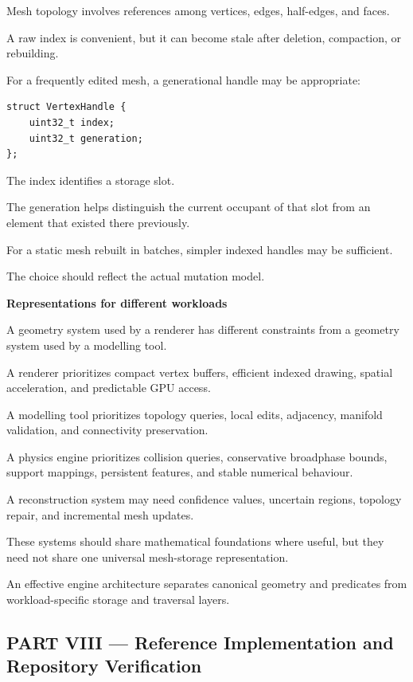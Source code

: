 Mesh topology involves references among vertices, edges, half-edges, and faces.

A raw index is convenient, but it can become stale after deletion, compaction, or rebuilding.

For a frequently edited mesh, a generational handle may be appropriate:

\begin{verbatim}
struct VertexHandle {
    uint32_t index;
    uint32_t generation;
};
\end{verbatim}

The index identifies a storage slot.

The generation helps distinguish the current occupant of that slot from an element that existed there previously.

For a static mesh rebuilt in batches, simpler indexed handles may be sufficient.

The choice should reflect the actual mutation model.

\textbf{Representations for different workloads}

A geometry system used by a renderer has different constraints from a geometry system used by a modelling tool.

A renderer prioritizes compact vertex buffers, efficient indexed drawing, spatial acceleration, and predictable GPU access.

A modelling tool prioritizes topology queries, local edits, adjacency, manifold validation, and connectivity preservation.

A physics engine prioritizes collision queries, conservative broadphase bounds, support mappings, persistent features, and stable numerical behaviour.

A reconstruction system may need confidence values, uncertain regions, topology repair, and incremental mesh updates.

These systems should share mathematical foundations where useful, but they need not share one universal mesh-storage representation.

An effective engine architecture separates canonical geometry and predicates from workload-specific storage and traversal layers.

\subsection{PART VIII --- Reference Implementation and Repository Verification}\label{04-visual-computing-ii-ch023-part-viii-reference-implementation-and-repository-verification}

